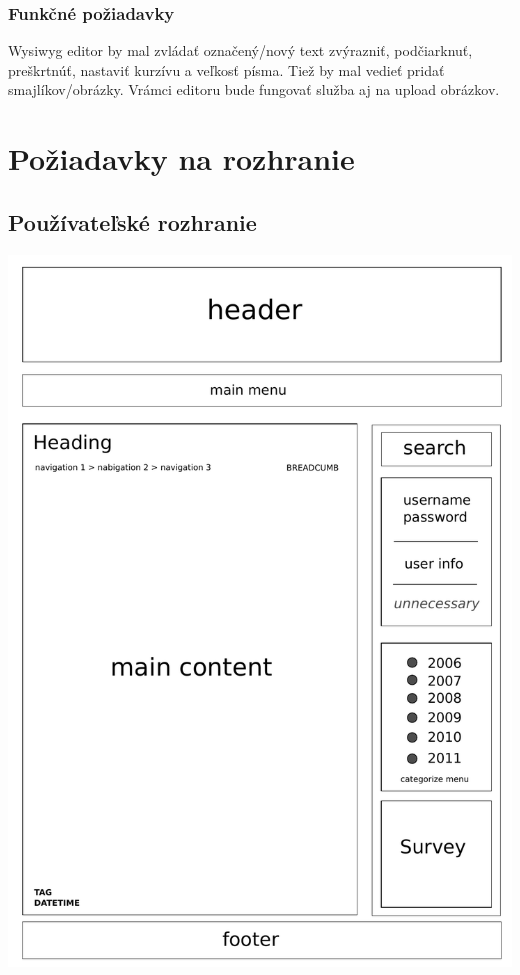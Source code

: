 \documentclass[a4paper,titlepage,11pt]{article}
\begin{document}
\subsubsection{Funkčné požiadavky}
Wysiwyg editor by mal zvládať označený\slash nový text zvýrazniť, podčiarknuť, preškrtnúť, nastaviť kurzívu a veľkosť písma. 
Tiež by mal vedieť pridať smajlíkov\slash obrázky. Vrámci editoru bude fungovať služba aj na upload obrázkov.

\newpage
\section{Požiadavky na rozhranie}
\subsection{Používateľské rozhranie}
\includegraphics[width=\textwidth]{user_interface.pdf}
\end{document}
